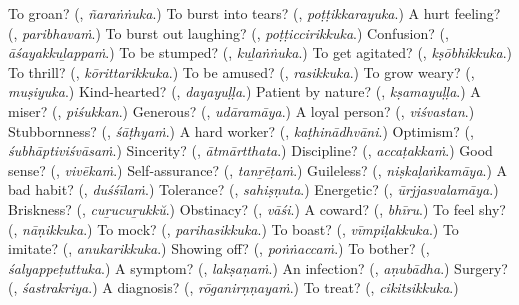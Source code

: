 \begin{tcolorbox}[breakable,colback=teal!4,colframe=teal!35!black,title={Before you move on}]
To groan? (\textbf{}, \emph{ñaraṅṅuka}.) To burst into tears? (\textbf{}, \emph{poṭṭikkarayuka}.) A hurt feeling? (\textbf{}, \emph{paribhavaṁ}.) To burst out laughing? (\textbf{}, \emph{poṭṭiccirikkuka}.) Confusion? (\textbf{}, \emph{āśayakkuḻappaṁ}.) To be stumped? (\textbf{}, \emph{kuḻaṅṅuka}.) To get agitated? (\textbf{}, \emph{kṣōbhikkuka}.) To thrill? (\textbf{}, \emph{kōrittarikkuka}.) To be amused? (\textbf{}, \emph{rasikkuka}.) To grow weary? (\textbf{}, \emph{muṣiyuka}.) Kind-hearted? (\textbf{}, \emph{dayayuḷḷa}.) Patient by nature? (\textbf{}, \emph{kṣamayuḷḷa}.) A miser? (\textbf{}, \emph{piśukkan}.) Generous? (\textbf{}, \emph{udāramāya}.) A loyal person? (\textbf{}, \emph{viśvastan}.) Stubbornness? (\textbf{}, \emph{śāṭhyaṁ}.) A hard worker? (\textbf{}, \emph{kaṭhinādhvāni}.) Optimism? (\textbf{}, \emph{śubhāptiviśvāsaṁ}.) Sincerity? (\textbf{}, \emph{ātmārtthata}.) Discipline? (\textbf{}, \emph{accaṭakkaṁ}.) Good sense? (\textbf{}, \emph{vivēkaṁ}.) Self-assurance? (\textbf{}, \emph{tanṟēṭaṁ}.) Guileless? (\textbf{}, \emph{niṣkaḷaṅkamāya}.) A bad habit? (\textbf{}, \emph{duśśīlaṁ}.) Tolerance? (\textbf{}, \emph{sahiṣṇuta}.) Energetic? (\textbf{}, \emph{ūrjjasvalamāya}.) Briskness? (\textbf{}, \emph{cuṟucuṟukkŭ}.) Obstinacy? (\textbf{}, \emph{vāśi}.) A coward? (\textbf{}, \emph{bhīru}.) To feel shy? (\textbf{}, \emph{nāṇikkuka}.) To mock? (\textbf{}, \emph{parihasikkuka}.) To boast? (\textbf{}, \emph{vīmpiḷakkuka}.) To imitate? (\textbf{}, \emph{anukarikkuka}.) Showing off? (\textbf{}, \emph{poṅṅaccaṁ}.) To bother? (\textbf{}, \emph{śalyappeṭuttuka}.) A symptom? (\textbf{}, \emph{lakṣaṇaṁ}.) An infection? (\textbf{}, \emph{aṇubādha}.) Surgery? (\textbf{}, \emph{śastrakriya}.) A diagnosis? (\textbf{}, \emph{rōganirṇṇayaṁ}.) To treat? (\textbf{}, \emph{cikitsikkuka}.)
\end{tcolorbox}
